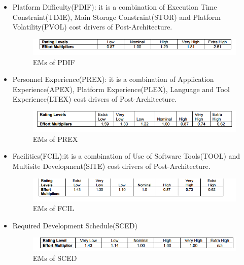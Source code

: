\begin{itemize}
\begin{itemize}[label = {-}]
\item Platform Difficulty(PDIF): it is a combination of Execution Time Constraint(TIME), Main Storage Constraint(STOR) and Platform Volatility(PVOL) cost drivers of Post-Architecture. 
\begin{figure}[H]	
	\centering
	\includegraphics[scale = 0.6]{img/PDIF.png}
	\caption{EMs of PDIF}
\end{figure}

\item Personnel Experience(PREX): it is a combination of Application Experience(APEX), Platform Experience(PLEX), Language and Tool Experience(LTEX) cost drivers of Post-Architecture. 
\begin{figure}[H]	
	\centering
	\includegraphics[scale = 0.6]{img/PREX.png}
	\caption{EMs of PREX}
\end{figure}

\item Facilities(FCIL):it is a combination of Use of Software Tools(TOOL) and Multisite Development(SITE) cost drivers of Post-Architecture. 

\begin{figure}[H]	
	\centering
	\includegraphics[scale = 0.6]{img/FCIL.png}
	\caption{EMs of FCIL}
\end{figure}

\item Required Development Schedule(SCED)

\begin{figure}[H]	
	\centering
	\includegraphics[scale = 0.6]{img/SCED.png}
	\caption{EMs of SCED}
\end{figure}

\end{itemize} 
\end{itemize}

